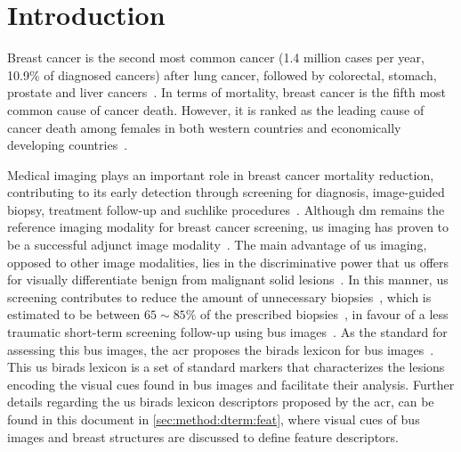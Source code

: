 \graphicspath{ {./content/intro/figures/} }

\section{Introduction}
\label{sec:intro}  %


Breast cancer is the second most common cancer (1.4 million cases per year, 10.9\% of  diagnosed cancers) after lung cancer, followed by colorectal, stomach, prostate and liver cancers~\cite{Ferlay2010}.
In terms of mortality, breast cancer is the fifth most common cause of cancer death.
However, it is ranked as the leading cause of cancer death among females in both western countries and economically developing countries~\cite{cancerStatistics2011}.

Medical imaging plays an important role in breast cancer mortality reduction, contributing to its early detection through screening for diagnosis, image-guided biopsy, treatment follow-up and suchlike procedures~\cite{smith2003american}.
Although \ac{dm} remains the reference imaging modality for breast cancer screening, \ac{us} imaging has proven to be a successful adjunct image modality~\cite{smith2003american,berg2004diagnostic}.
The main advantage of \ac{us} imaging, opposed to other image modalities, lies in the discriminative power that \ac{us} offers for visually differentiate benign from malignant solid lesions~\cite{Stavros:1995p12392}.
In this manner, \ac{us} screening contributes to reduce the amount of unnecessary biopsies~\cite{ciatto1994contribution}, which is estimated to be between $65\sim85\%$ of the prescribed biopsies~\cite{yuan2010multimodality}, in favour of a less traumatic short-term screening follow-up using \ac{bus} images~\cite{gordon1995malignant}.
As the standard for assessing this \ac{bus} images, the \ac{acr} proposes the \ac{birads} lexicon for \ac{bus} images~\cite{biradsus}.
This \ac{us} \ac{birads} lexicon is a set of standard markers that characterizes the lesions encoding the visual cues found in \ac{bus} images and facilitate their analysis.
Further details regarding the \ac{us} \ac{birads} lexicon descriptors proposed by the \ac{acr}, can be found in this document in \cref{sec:method:dterm:feat}, where visual cues of \ac{bus} images and breast structures are discussed to define feature descriptors.

